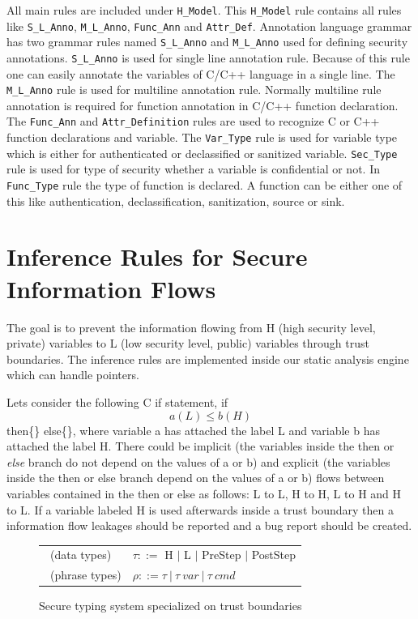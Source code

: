 All main rules are included under \texttt{H\_Model}. This  \texttt{H\_Model} rule contains all rules like \texttt{S\_L\_Anno}, \texttt{M\_L\_Anno}, \texttt{Func\_Ann} and \texttt{Attr\_Def}. Annotation language grammar has two grammar rules named \texttt{S\_L\_Anno} and \texttt{M\_L\_Anno} used for defining security annotations. \texttt{S\_L\_Anno} is used for single line annotation rule. Because of this rule one can easily annotate the variables of C/C++ language in a single line. The \texttt{M\_L\_Anno} rule is used for multiline annotation rule. Normally multiline rule annotation is required for function annotation in C/C++ function declaration. The \texttt{Func\_Ann} and \texttt{Attr\_Definition} rules are used to recognize C or C++ function declarations and variable. The \texttt{Var\_Type} rule is used for variable type which is either for authenticated or declassified or sanitized variable. \texttt{Sec\_Type} rule is used for type of security whether a variable is confidential or not. In \texttt{Func\_Type} rule the type of function is declared. A function can be either one of this like authentication, declassification, sanitization, source or sink.

\section{Inference Rules for Secure Information Flows}

The goal is to prevent the information flowing from H (high security level, private) variables to 
L (low security level, public) variables through trust boundaries. The inference rules are implemented
inside our static analysis engine which can handle pointers. 

Lets consider the following C if statement, if  \[ a(L) \leq b(H)\] then\{\} else\{\}, where variable a has attached the label L and variable b has attached the label H.
There could be implicit (the variables inside the then or \emph{else} branch do not depend on the values of a or b) 
and explicit (the variables inside the then or else branch depend on the values of a or b) flows between variables
contained in the then or else as follows: L to L, H to H, L to H and H to L. If a variable labeled H is used afterwards inside
a trust boundary then a information flow leakages should be reported and a bug report should be created. 

\begin{figure}[ht!]
	\centering
	\begin{tabular}{ll}    
		\circled{A}\ (data types)   &$\tau ::= $ H    $|$  L  $|$ PreStep $|$ PostStep   \\ 
		\circled{B}\ (phrase types) &$\rho ::=  \tau \ | \ \tau \ var \ | \ \tau \ cmd $ \\
	\end{tabular}
	\caption{Secure typing system specialized on trust boundaries}
	\label{typing:system1}
\end{figure}

